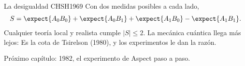 \documentclass[12pt]{beamer}
\begin{document}
\begin{frame}{La desigualdad CHSH}{1969}
Con dos medidas posibles a cada lado,
\[
  S = \expect{A_0B_0} + \expect{A_0B_1} + \expect{A_1B_0} - \expect{A_1B_1}.
\]
Cualquier teoría local y realista cumple $|S| \le 2$. La mecánica cuántica
llega más lejos:
Es la cota de Tsirelson (1980), y los experimentos le dan la razón.
\end{frame}

  {Próximo capítulo: 1982, el experimento de Aspect paso a paso.}
\end{document}
